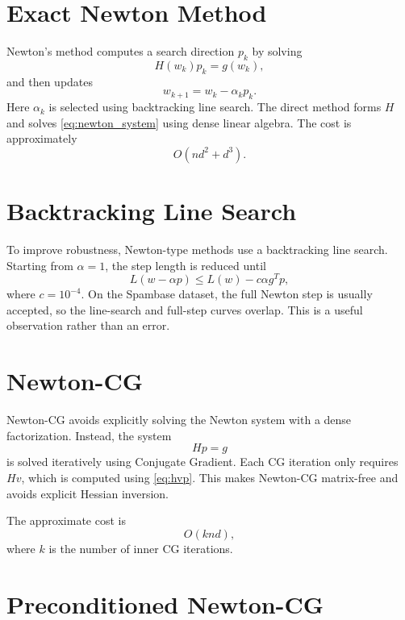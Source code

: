 \documentclass[12pt,a4paper]{report}
\begin{document}
\section{Exact Newton Method}

Newton's method computes a search direction \(p_k\) by solving
\begin{equation}
    H(w_k)p_k=g(w_k),
    \label{eq:newton_system}
\end{equation}
and then updates
\begin{equation}
    w_{k+1}=w_k-\alpha_k p_k.
\end{equation}
Here \(\alpha_k\) is selected using backtracking line search. The direct method forms \(H\) and solves \eqref{eq:newton_system} using dense linear algebra. The cost is approximately
\begin{equation}
    O(nd^2+d^3).
\end{equation}

\section{Backtracking Line Search}

To improve robustness, Newton-type methods use a backtracking line search. Starting from \(\alpha=1\), the step length is reduced until
\begin{equation}
    L(w-\alpha p)
    \le
    L(w)-c\alpha g^T p,
\end{equation}
where \(c=10^{-4}\). On the Spambase dataset, the full Newton step is usually accepted, so the line-search and full-step curves overlap. This is a useful observation rather than an error.

\section{Newton-CG}

Newton-CG avoids explicitly solving the Newton system with a dense factorization. Instead, the system
\[
H p = g
\]
is solved iteratively using Conjugate Gradient. Each CG iteration only requires \(Hv\), which is computed using \eqref{eq:hvp}. This makes Newton-CG matrix-free and avoids explicit Hessian inversion.

The approximate cost is
\begin{equation}
    O(knd),
\end{equation}
where \(k\) is the number of inner CG iterations.

\section{Preconditioned Newton-CG}
\end{document}
